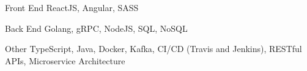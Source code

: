 


\begin{cvskills}


\cvskill
{Front End} %
{ReactJS, Angular, SASS} %


\cvskill
{Back End} %
{Golang, gRPC, NodeJS, SQL, NoSQL} %


\cvskill
{Other} %
{TypeScript, Java, Docker, Kafka, CI/CD (Travis and Jenkins), RESTful APIs, Microservice Architecture} %


\end{cvskills}